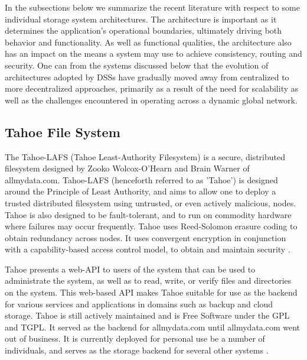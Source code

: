 \documentclass[11pt]{article}
\begin{document}
In the subsections below we summarize the recent literature with respect to 
some individual storage system architectures. The architecture is important 
as it determines the application’s operational boundaries, ultimately driving 
both  behavior and functionality. As well as functional qualities, the 
architecture also has an impact on the means a system may use to achieve 
consistency, routing and security. One can from the systems discussed below 
that the evolution of architectures adopted by DSSs have gradually moved away 
from centralized to more decentralized approaches, primarily as a result of 
the need for scalability as well as the challenges encountered in operating 
across a dynamic global network.


\subsection{Tahoe File System}

The Tahoe-LAFS (Tahoe Least-Authority Filesystem) is a secure,
distributed filesystem designed by Zooko Wolcox-O'Hearn and Brain
Warner of allmydata.com. Tahoe-LAFS (henceforth referred to as
'Tahoe') is designed around the Principle of Least Authority, and aims
to allow one to deploy a trusted distributed filesystem using
untrusted, or even actively malicious, nodes. Tahoe is also designed
to be fault-tolerant, and to run on commodity hardware where failures
may occur frequently. Tahoe uses Reed-Solomon erasure coding to obtain
redundancy across nodes. It uses convergent encryption in conjunction
with a capability-based access control model, to obtain and maintain
security \cite{WilcoxOHearn:2008p1275}.

Tahoe presents a web-API to users of the system that can be used to
administrate the system, as well as to read, write, or verify files
and directories on the system. This web-based API makes Tahoe suitable
for use as the backend for various services and applications in
domains such as backup and cloud storage. Tahoe is still actively
maintained and is Free Software under the GPL and TGPL. It served as the
backend for allmydata.com until allmydata.com went out of business. It
is currently deployed for personal use be a number of individuals, and
serves as the storage backend for several other
systems \cite{tahoe-lafs.org}. 
\end{document}
